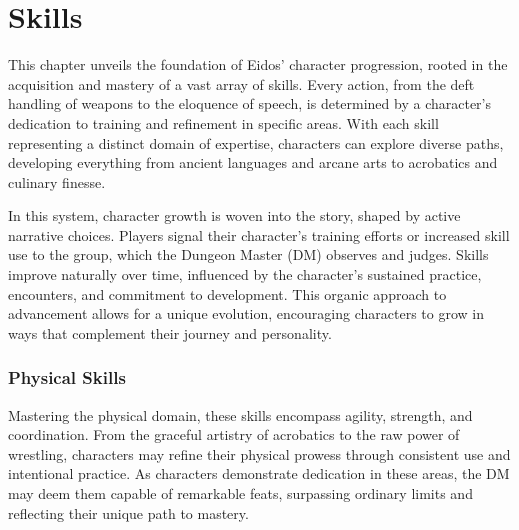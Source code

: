 \chapter{Skills}

This chapter unveils the foundation of Eidos' character progression, rooted in the acquisition and mastery of a vast array of skills. Every action, from the deft handling of weapons to the eloquence of speech, is determined by a character's dedication to training and refinement in specific areas. With each skill representing a distinct domain of expertise, characters can explore diverse paths, developing everything from ancient languages and arcane arts to acrobatics and culinary finesse. 

In this system, character growth is woven into the story, shaped by active narrative choices. Players signal their character’s training efforts or increased skill use to the group, which the Dungeon Master (DM) observes and judges. Skills improve naturally over time, influenced by the character’s sustained practice, encounters, and commitment to development. This organic approach to advancement allows for a unique evolution, encouraging characters to grow in ways that complement their journey and personality.

\subsection{\textbf{Physical Skills}}

Mastering the physical domain, these skills encompass agility, strength, and coordination. From the graceful artistry of acrobatics to the raw power of wrestling, characters may refine their physical prowess through consistent use and intentional practice. As characters demonstrate dedication in these areas, the DM may deem them capable of remarkable feats, surpassing ordinary limits and reflecting their unique path to mastery.

